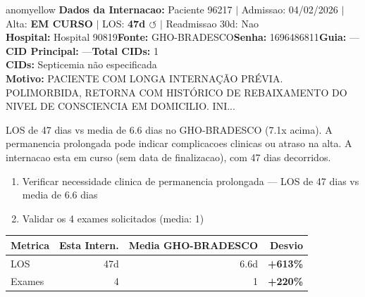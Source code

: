 \documentclass[a4paper,10pt]{article}
\begin{document}
\begin{anomalycard}[Internacao 115983 | GHO-BRADESCO | MODERADO (z=2.26)]{anomyellow}
\textbf{Dados da Internacao:} Paciente 96217 $\mid$ Admissao: 04/02/2026 $\mid$ Alta: \textcolor{anomorange}{\textbf{EM CURSO}} $\mid$ LOS: \textbf{47d \textcolor{anomorange}{$\circlearrowleft$}} $\mid$ Readmissao 30d: Nao\\
\textbf{Hospital:} Hospital 90819\quad\textbf{Fonte:} GHO-BRADESCO\quad\textbf{Senha:} 1696486811\quad\textbf{Guia:} ---\\
\textbf{CID Principal:} {\small ---}\quad\textbf{Total CIDs:} 1\\

\textbf{CIDs:} {\scriptsize Septicemia não especificada}\\

\textbf{Motivo:} {\scriptsize PACIENTE COM LONGA INTERNAÇÃO PRÉVIA. POLIMORBIDA, RETORNA COM HISTÓRICO DE REBAIXAMENTO DO NIVEL DE CONSCIENCIA EM DOMICILIO. INI...}\\

\vspace{2pt}\begin{tcolorbox}[colback=severityred!20,colframe=anomyellow,title={\textbf{Interpretacao de Negocio}},fonttitle=\bfseries\small,left=4pt,right=4pt,top=3pt,bottom=3pt]
{\small LOS de 47 dias vs media de 6.6 dias no GHO-BRADESCO (7.1x acima). A permanencia prolongada pode indicar complicacoes clinicas ou atraso na alta. A internacao esta em curso (sem data de finalizacao), com 47 dias decorridos.}
\end{tcolorbox}
\begin{tcolorbox}[colback=severityyellow!30,colframe=anomorange,title={\textbf{Recomendacoes Especificas}},fonttitle=\bfseries\small,left=4pt,right=4pt,top=3pt,bottom=3pt]
\begin{enumerate}[nosep,leftmargin=16pt]
\item {\small Verificar necessidade clinica de permanencia prolongada --- LOS de 47 dias vs media de 6.6 dias}
\item {\small Validar os 4 exames solicitados (media: 1)}
\end{enumerate}
\end{tcolorbox}
\begin{center}\begin{tabular}{l r r r}\toprule\textbf{Metrica} & \textbf{Esta Intern.} & \textbf{Media GHO-BRADESCO} & \textbf{Desvio} \\\midrule
LOS & 47d & 6.6d & \textcolor{anomred}{\textbf{+613\%}} \\
Exames & 4 & 1 & \textcolor{anomred}{\textbf{+220\%}} \\
\bottomrule\end{tabular}\end{center}


\end{anomalycard}
\end{document}

